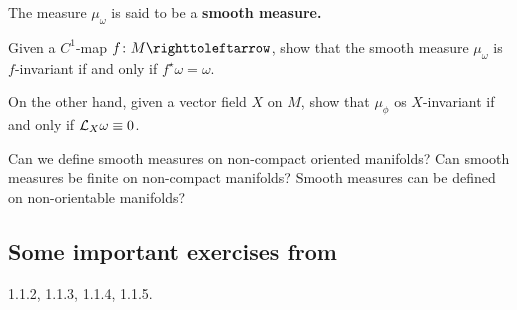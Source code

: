 The measure $\mu_{\omega}$ is said to be a \textbf{smooth measure.}
\begin{exercise}
  Given a $C^1$-map $f\colon M\carr$, show that the smooth measure $\mu_\omega$ is $f$-invariant if and only if $f^\star\omega=\omega$.

  On the other hand, given a vector field $X$ on $M$, show that $\mu_\phi$ os $X$-invariant if and only if $\mathcal{L}_X\omega\equiv 0$.
\end{exercise}

\begin{exercise}
  Can we define smooth measures on non-compact oriented manifolds? Can smooth measures be finite on non-compact manifolds? Smooth measures can be defined on non-orientable manifolds?
\end{exercise}

\subsection{Some important exercises from~\cite[\S1.1.1]{VianaOliveiraFoundErgTh}}\label{sec:some-import-exerc-1.1.1}

1.1.2, 1.1.3, 1.1.4, 1.1.5.
